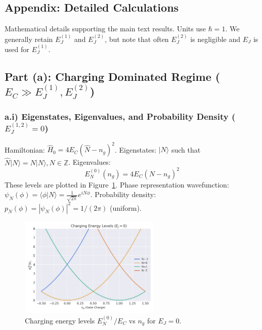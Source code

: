 \documentclass[12pt]{article}
\begin{document}
\newpage 
\begin{appendices}
\section{Appendix: Detailed Calculations}
\label{app:calculations}
Mathematical details supporting the main text results. Units use $\hbar=1$. We generally retain $E_J^{(1)}$ and $E_J^{(2)}$, but note that often $E_J^{(2)}$ is negligible and $E_J$ is used for $E_J^{(1)}$. %

\subsection[Part (a): Charging Dominated Regime]{Part (a): Charging Dominated Regime ($E_C \gg E_J^{(1)}, E_J^{(2)}$)}
\label{app:part_a}

\subsubsection*{a.i) Eigenstates, Eigenvalues, and Probability Density ($E_J^{(1,2)}=0$)}
\label{app:part_a:subsubsec_i}
Hamiltonian: $\hat{H}_0 = 4 E_C (\hat{N} - n_g)^2$.
Eigenstates: $|N\rangle$ such that $\hat{N}|N\rangle = N|N\rangle, N \in \mathbb{Z}$.
Eigenvalues:
\[ E_N^{(0)}(n_g) = 4 E_C (N - n_g)^2 \]
These levels are plotted in Figure~\ref{fig:app_charge_levels}.
Phase representation wavefunction: $\psi_N(\phi) = \langle \phi | N \rangle = \frac{1}{\sqrt{2\pi}} e^{i N \phi}$.
Probability density: $p_N(\phi) = |\psi_N(\phi)|^2 = 1/(2\pi)$ (uniform).

\begin{figure}[htbp] %
    \centering
    \includegraphics[width=0.6\textwidth]{fig_charge_levels.png}
    \caption{Charging energy levels $E_N^{(0)}/E_C$ vs $n_g$ for $E_J=0$.}
    \label{fig:app_charge_levels} 
\end{figure}


\end{appendices}
\end{document}
